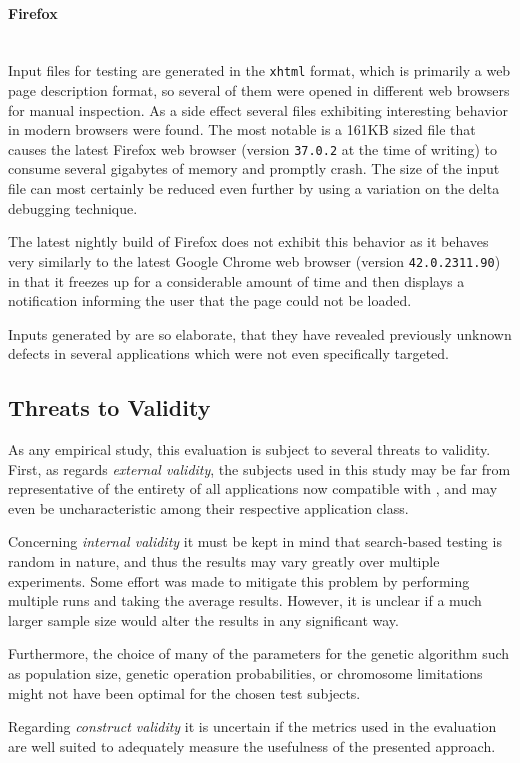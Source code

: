 \paragraph{Firefox} ~\\
Input files for testing \libxml are generated in the \texttt{xhtml} format, which is primarily a web page
description format, so several of them were opened in different web browsers for manual inspection. As a side
effect several files exhibiting interesting behavior in modern browsers were found. The most notable is a 161KB
sized file that causes the latest Firefox web browser (version \texttt{37.0.2} at the time of writing) to
consume several gigabytes of memory and promptly crash. The size of the input file can most certainly be
reduced even further by using a variation on the delta debugging technique\cite{zeller2002simplifying}. 

The latest nightly build of Firefox does not exhibit this behavior as it behaves very similarly to the 
latest Google Chrome web browser (version \texttt{42.0.2311.90}) in that it freezes up for a
considerable amount of time and then displays a notification informing the user that the page could not be
loaded.

\begin{mdframed}
Inputs generated by \xmlmate are so elaborate, that they have revealed previously unknown defects in several
applications which were not even specifically targeted.
\end{mdframed}

\subsection{Threats to Validity}
As any empirical study, this evaluation is subject to several threats to validity.
First, as regards \emph{external validity}, the subjects used in this study may be far from representative of
the entirety of all applications now compatible with \xmlmate, and may even be uncharacteristic among their
respective application class.

Concerning \emph{internal validity} it must be kept in mind that search-based testing is random in nature, and
thus the results may vary greatly over multiple experiments. Some effort was made to mitigate this problem by
performing multiple runs and taking the average results. However, it is unclear if a much larger sample size
would alter the results in any significant way.

Furthermore, the choice of many of the parameters for the genetic algorithm such as population size,
genetic operation probabilities, or chromosome limitations might not have been optimal for the chosen test
subjects.

Regarding \emph{construct validity} it is uncertain if the metrics used in the evaluation are well suited
to adequately measure the usefulness of the presented approach.
 
